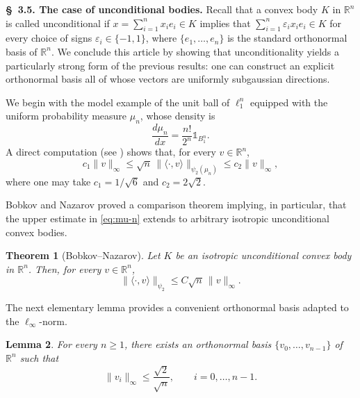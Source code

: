 \documentclass[11pt,leqno]{article}
\newtheorem{theorem}{Theorem}[section]
\newtheorem{lemma}[theorem]{Lemma}
\theoremstyle{definition}
\numberwithin{equation}{section}
\newcommand{\ls}{\leqslant}
\begin{document}
\medskip 

\noindent \textbf{\S~3.5. The case of unconditional bodies.}
Recall that a convex body $K$ in $\mathbb{R}^n$ is called unconditional if $x=\sum_{i=1}^n x_i e_i\in K$ implies that
$\sum_{i=1}^n\varepsilon_i x_i e_i\in K$ for every choice of signs $\varepsilon_i\in\{-1,1\}$, where
$\{e_1,\ldots,e_n\}$ is the standard orthonormal basis of $\mathbb{R}^n$.
We conclude this article by showing that unconditionality yields a particularly strong form of the previous results: one can construct an explicit orthonormal basis all of whose vectors are uniformly subgaussian directions.

We begin with the model example of the unit ball of $\ell_1^n$ equipped with the uniform probability measure $\mu_n$, whose density is
\[\frac{d\mu_n}{dx}=\frac{n!}{2^n}\mathds{1}_{B_1^n}.\]
A direct computation (see \cite{Bobkov-Nazarov-2003}) shows that, for every $v\in\mathbb{R}^n$,
\begin{equation}\label{eq:mu-n}
c_1\|v\|_\infty\ls\sqrt n\,\|\langle\cdot,v\rangle\|_{\psi_2(\mu_n)}\ls c_2\|v\|_\infty,
\end{equation}
where one may take $c_1=1/\sqrt6$ and $c_2=2\sqrt2$.

Bobkov and Nazarov \cite{Bobkov-Nazarov-2003} proved a comparison theorem implying, in particular, that the upper estimate in \eqref{eq:mu-n} extends to 
arbitrary isotropic unconditional convex bodies.

\begin{theorem}[Bobkov--Nazarov]\label{th:unco-psi-2}
Let $K$ be an isotropic unconditional convex body in $\mathbb{R}^n$. Then, for every $v\in\mathbb{R}^n$,
\[\|\langle\cdot,v\rangle\|_{\psi_2}\ls C\sqrt n\,\|v\|_\infty.\]
\end{theorem}

The next elementary lemma provides a convenient orthonormal basis adapted to the $\ell_\infty$-norm.

\begin{lemma}\label{lem:fourier-basis}
For every $n\ge1$, there exists an orthonormal basis $\{v_0,\ldots,v_{n-1}\}$ of $\mathbb{R}^n$ such that
\[\|v_i\|_\infty\ls\frac{\sqrt2}{\sqrt n},\qquad i=0,\ldots,n-1.\]
\end{lemma}
\end{document}

